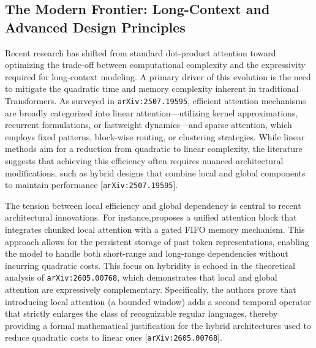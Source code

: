 \documentclass[11pt]{article}
\begin{document}
\subsection{The Modern Frontier: Long-Context and Advanced Design Principles}

Recent research has shifted from standard dot-product attention toward optimizing the trade-off between computational complexity and the expressivity required for long-context modeling. A primary driver of this evolution is the need to mitigate the quadratic time and memory complexity inherent in traditional Transformers. As surveyed in \texttt{arXiv:2507.19595}, efficient attention mechanisms are broadly categorized into linear attention—utilizing kernel approximations, recurrent formulations, or fastweight dynamics—and sparse attention, which employs fixed patterns, block-wise routing, or clustering strategies. While linear methods aim for a reduction from quadratic to linear complexity, the literature suggests that achieving this efficiency often requires nuanced architectural modifications, such as hybrid designs that combine local and global components to maintain performance [\texttt{arXiv:2507.19595}].

The tension between local efficiency and global dependency is central to recent architectural innovations. For instance,proposes a unified attention block that integrates chunked local attention with a gated FIFO memory mechanism. This approach allows for the persistent storage of past token representations, enabling the model to handle both short-range and long-range dependencies without incurring quadratic costs. This focus on hybridity is echoed in the theoretical analysis of \texttt{arXiv:2605.00768}, which demonstrates that local and global attention are expressively complementary. Specifically, the authors prove that introducing local attention (a bounded window) adds a second temporal operator that strictly enlarges the class of recognizable regular languages, thereby providing a formal mathematical justification for the hybrid architectures used to reduce quadratic costs to linear ones [\texttt{arXiv:2605.00768}].
\end{document}
